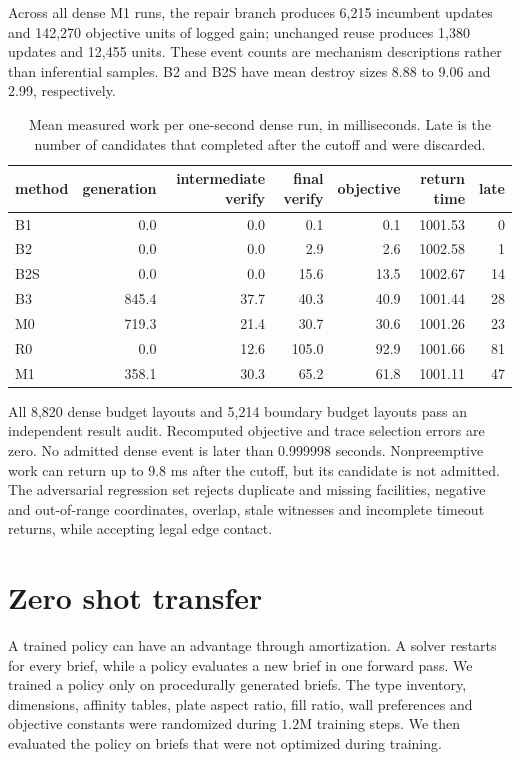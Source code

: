 \documentclass[11pt]{article}
\begin{document}
Across all dense M1 runs, the repair branch produces 6,215 incumbent updates
and 142,270 objective units of logged gain; unchanged reuse produces 1,380
updates and 12,455 units. These event counts are mechanism descriptions rather
than inferential samples. B2 and B2S have mean destroy sizes 8.88 to 9.06 and
2.99, respectively.

\begin{table}[htbp]
\centering
\caption{Mean measured work per one-second dense run, in milliseconds. Late is
the number of candidates that completed after the cutoff and were discarded.}
\label{tab:sharedtiming}
\small
\begin{tabular}{@{}lrrrrrr@{}}
\toprule
method & generation & intermediate verify & final verify & objective & return time & late \\
\midrule
B1  & 0.0 & 0.0 & 0.1 & 0.1 & 1001.53 & 0 \\
B2  & 0.0 & 0.0 & 2.9 & 2.6 & 1002.58 & 1 \\
B2S & 0.0 & 0.0 & 15.6 & 13.5 & 1002.67 & 14 \\
B3  & 845.4 & 37.7 & 40.3 & 40.9 & 1001.44 & 28 \\
M0  & 719.3 & 21.4 & 30.7 & 30.6 & 1001.26 & 23 \\
R0  & 0.0 & 12.6 & 105.0 & 92.9 & 1001.66 & 81 \\
M1  & 358.1 & 30.3 & 65.2 & 61.8 & 1001.11 & 47 \\
\bottomrule
\end{tabular}
\end{table}

All 8,820 dense budget layouts and 5,214 boundary budget layouts pass an
independent result audit. Recomputed objective and trace selection errors are
zero. No admitted dense event is later than 0.999998 seconds. Nonpreemptive
work can return up to 9.8 ms after the cutoff, but its candidate is not admitted.
The adversarial regression set rejects duplicate and missing
facilities, negative and out-of-range coordinates, overlap, stale witnesses and
incomplete timeout returns, while accepting legal edge contact.

\clearpage

\section{Zero shot transfer}
\label{app:transfer}
A trained policy can have an advantage through amortization. A solver restarts
for every brief, while a policy evaluates a new brief in one forward pass. We
trained a policy only on procedurally generated briefs. The type inventory,
dimensions, affinity tables, plate aspect ratio, fill ratio, wall preferences
and objective constants were randomized during $1.2$M training steps. We then
evaluated the policy on briefs that were not optimized during training.
\end{document}
